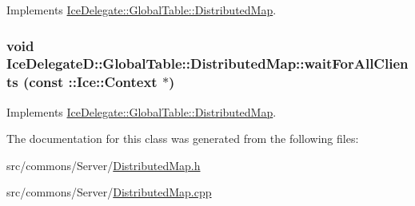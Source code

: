 Implements \hyperlink{class_ice_delegate_1_1_global_table_1_1_distributed_map_ab61ffb89d4f5e7aed0c9ef26db2cf08c}{IceDelegate::GlobalTable::DistributedMap}.

\hypertarget{class_ice_delegate_d_1_1_global_table_1_1_distributed_map_ab0e09c703e60b2822ae949361e2fe627}{
\subsubsection[{waitForAllClients}]{\setlength{\rightskip}{0pt plus 5cm}void IceDelegateD::GlobalTable::DistributedMap::waitForAllClients (const ::Ice::Context $\ast$)}}
\label{class_ice_delegate_d_1_1_global_table_1_1_distributed_map_ab0e09c703e60b2822ae949361e2fe627}


Implements \hyperlink{class_ice_delegate_1_1_global_table_1_1_distributed_map_ad589c12e7d1d78e40769d30fc9d485c9}{IceDelegate::GlobalTable::DistributedMap}.



The documentation for this class was generated from the following files:\begin{DoxyCompactItemize}
\item 
src/commons/Server/\hyperlink{_distributed_map_8h}{DistributedMap.h}\item 
src/commons/Server/\hyperlink{_distributed_map_8cpp}{DistributedMap.cpp}\end{DoxyCompactItemize}
